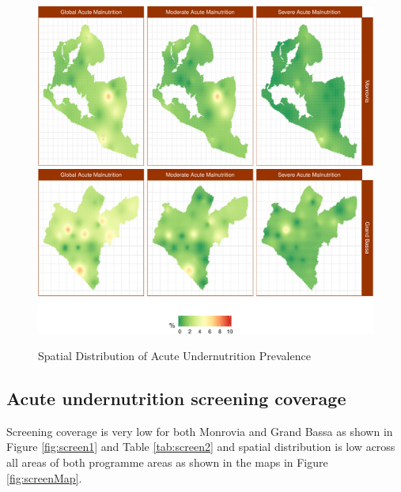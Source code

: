\documentclass[12pt,a4paper]{article}
\theoremstyle{definition}
\theoremstyle{definition}
\theoremstyle{definition}
\theoremstyle{remark}
\begin{document}
\begin{figure}[H]

{\centering \includegraphics{liberiaCoverageReport_files/figure-latex/nutMap-1} \includegraphics{liberiaCoverageReport_files/figure-latex/nutMap-2} 

}

\caption{Spatial Distribution of Acute Undernutrition Prevalence}\label{fig:nutMap}
\end{figure}

\newpage

\hypertarget{acute-undernutrition-screening-coverage}{%
\subsection{Acute undernutrition screening
coverage}\label{acute-undernutrition-screening-coverage}}

Screening coverage is very low for both Monrovia and Grand Bassa as
shown in Figure \ref{fig:screen1} and Table \ref{tab:screen2} and
spatial distribution is low across all areas of both programme areas as
shown in the maps in Figure \ref{fig:screenMap}.
\end{document}
